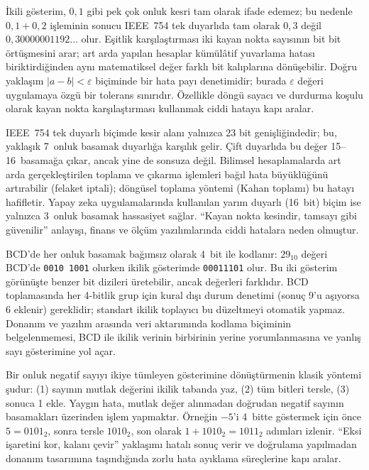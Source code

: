 İkili gösterim, $0{,}1$ gibi pek çok onluk kesri tam olarak ifade edemez; bu nedenle $0{,}1 + 0{,}2$ işleminin sonucu IEEE~754 tek duyarlıda tam olarak $0{,}3$ değil $0{,}30000001192\ldots$ olur. Eşitlik karşılaştırması iki kayan nokta sayısının bit bit örtüşmesini arar; art arda yapılan hesaplar kümülâtif yuvarlama hatası biriktirdiğinden aynı matematiksel değer farklı bit kalıplarına dönüşebilir. Doğru yaklaşım $|a - b| < \varepsilon$ biçiminde bir hata payı denetimidir; burada $\varepsilon$ değeri uygulamaya özgü bir tolerans sınırıdır. Özellikle döngü sayacı ve durdurma koşulu olarak kayan nokta karşılaştırması kullanmak ciddi hataya kapı aralar.

IEEE~754 tek duyarlı biçimde kesir alanı yalnızca 23 bit genişliğindedir; bu, yaklaşık 7~onluk basamak duyarlığa karşılık gelir. Çift duyarlıda bu değer 15--16~basamağa çıkar, ancak yine de sonsuza değil. Bilimsel hesaplamalarda art arda gerçekleştirilen toplama ve çıkarma işlemleri bağıl hata büyüklüğünü artırabilir (felaket iptali); döngüsel toplama yöntemi (Kahan toplamı) bu hatayı hafifletir. Yapay zeka uygulamalarında kullanılan yarım duyarlı (16~bit) biçim ise yalnızca 3~onluk basamak hassasiyet sağlar. ``Kayan nokta kesindir, tamsayı gibi güvenilir'' anlayışı, finans ve ölçüm yazılımlarında ciddi hatalara neden olmuştur.

BCD'de her onluk basamak bağımsız olarak 4~bit ile kodlanır: $29_{10}$ değeri BCD'de \texttt{0010 1001} olurken ikilik gösterimde \texttt{00011101} olur. Bu iki gösterim görünüşte benzer bit dizileri üretebilir, ancak değerleri farklıdır. BCD toplamasında her 4-bitlik grup için kural dışı durum denetimi (sonuç 9'u aşıyorsa 6 eklenir) gereklidir; standart ikilik toplayıcı bu düzeltmeyi otomatik yapmaz. Donanım ve yazılım arasında veri aktarımında kodlama biçiminin belgelenmemesi, BCD ile ikilik verinin birbirinin yerine yorumlanmasına ve yanlış sayı gösterimine yol açar.

Bir onluk negatif sayıyı ikiye tümleyen gösterimine dönüştürmenin klasik yöntemi şudur: (1) sayının mutlak değerini ikilik tabanda yaz, (2) tüm bitleri tersle, (3) sonuca 1 ekle. Yaygın hata, mutlak değer alınmadan doğrudan negatif sayının basamakları üzerinden işlem yapmaktır. Örneğin $-5$'i 4~bitte göstermek için önce $5 = 0101_2$, sonra tersle $1010_2$, son olarak $1 + 1010_2 = 1011_2$ adımları izlenir. ``Eksi işaretini kor, kalanı çevir'' yaklaşımı hatalı sonuç verir ve doğrulama yapılmadan donanım tasarımına taşındığında zorlu hata ayıklama süreçlerine kapı aralar.

